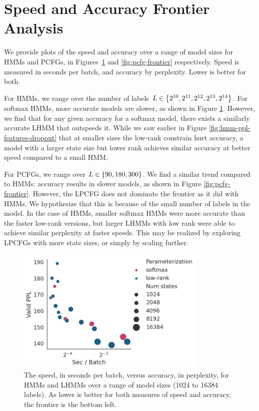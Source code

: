 \documentclass{article}
\begin{document}
\section{\label{sec:frontier} Speed and Accuracy Frontier Analysis}
We provide plots of the speed and accuracy over a range of model sizes for HMMs and PCFGs,
in Figures~\ref{fig:hmm-frontier} and \ref{fig:pcfg-frontier} respectively.
Speed is measured in seconds per batch, and accuracy by perplexity.
Lower is better for both.

For HMMs, we range over the number of labels $L\in\left\{2^{10},2^{11},2^{12},2^{13},2^{14}\right\}$.
For softmax HMMs, more accurate models are slower, as shown in Figure \ref{fig:hmm-frontier}.
However, we find that for any given accuracy for a softmax model,
there exists a similarly accurate LHMM that outspeeds it.
While we saw earlier in Figure \ref{fig:hmm-ppl-features-dropout}
that at smaller sizes
the low-rank constrain hurt accuracy, a model with a larger state size but
lower rank achieves similar accuracy at better speed compared to a small HMM.

For PCFGs, we range over $L\in\left\{90,180,300\right\}$.
We find a similar trend compared to HMMs: accuracy results in slower models,
as shown in Figure \ref{fig:pcfg-frontier}.
However, the LPCFG does not dominate the frontier as it did with HMMs.
We hypothesize that this is because of the small number of labels in the model.
In the case of HMMs, smaller softmax HMMs were more accurate than the faster low-rank versions,
but larger LHMMs with low rank were able to achieve similar perplexity at faster speeds.
This may be realized by exploring LPCFGs with more state sizes,
or simply by scaling further.

\begin{figure}[H]
\centering
\includegraphics[height=6cm]{imgs/hmm/lhmm-speed-accuracy.png}
\caption{
\label{fig:hmm-frontier}
The speed, in seconds per batch, versus accuracy, in perplexity, for HMMs and LHMMs over a range of model sizes
(1024 to 16384 labels).
As lower is better for both measures of speed and accuracy, the frontier is the bottom left.
}
\end{figure}
\end{document}
